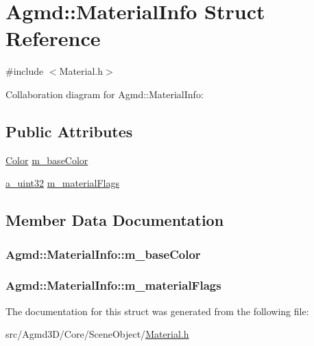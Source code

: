 \hypertarget{struct_agmd_1_1_material_info}{\section{Agmd\+:\+:Material\+Info Struct Reference}
\label{struct_agmd_1_1_material_info}
}


{\ttfamily \#include $<$Material.\+h$>$}



Collaboration diagram for Agmd\+:\+:Material\+Info\+:
\subsection*{Public Attributes}
\begin{DoxyCompactItemize}
\item 
\hyperlink{class_agmd_utilities_1_1_color}{Color} \hyperlink{struct_agmd_1_1_material_info_a9d57d2f23e9a5877ad8830c82fb65d77}{m\+\_\+base\+Color}
\item 
\hyperlink{_common_defines_8h_a964296f9770051b9e4807b1f180dd416}{a\+\_\+uint32} \hyperlink{struct_agmd_1_1_material_info_a4830c033753a2c156cc94fe03d357446}{m\+\_\+material\+Flags}
\end{DoxyCompactItemize}


\subsection{Member Data Documentation}
\hypertarget{struct_agmd_1_1_material_info_a9d57d2f23e9a5877ad8830c82fb65d77}{
\subsubsection[{m\+\_\+base\+Color}]{ Agmd\+::\+Material\+Info\+::m\+\_\+base\+Color}}\label{struct_agmd_1_1_material_info_a9d57d2f23e9a5877ad8830c82fb65d77}
\hypertarget{struct_agmd_1_1_material_info_a4830c033753a2c156cc94fe03d357446}{
\subsubsection[{m\+\_\+material\+Flags}]{ Agmd\+::\+Material\+Info\+::m\+\_\+material\+Flags}}\label{struct_agmd_1_1_material_info_a4830c033753a2c156cc94fe03d357446}


The documentation for this struct was generated from the following file\+:\begin{DoxyCompactItemize}
\item 
src/\+Agmd3\+D/\+Core/\+Scene\+Object/\hyperlink{_material_8h}{Material.\+h}\end{DoxyCompactItemize}
